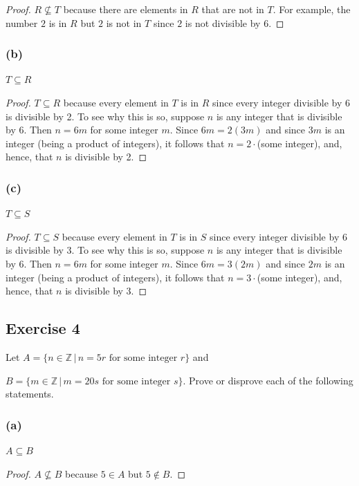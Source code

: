 \documentclass[14pt]{extarticle}
\newcommand{\Z}{\mathbb{Z}}
\begin{document}
\begin{proof}
\(R \nsubseteq T\) because there are elements in $R$ that are not in $T$. For example, the number $2$ is in $R$ but 
$2$ is not in $T$ since $2$ is not divisible by $6$.
\end{proof}

\subsubsection{(b)}
\(T \subseteq R\)

\begin{proof}
\(T \subseteq R\) because every element in $T$ is in $R$ since every integer divisible by 6 is divisible by 2. To 
see why this is so, suppose $n$ is any integer that is divisible by 6. Then $n = 6m$ for some integer $m$. Since 
\(6m = 2(3m)\) and since $3m$ is an integer (being a product of integers), it follows that \(n = 2 \cdot \)(some 
integer), and, hence, that $n$ is divisible by 2.
\end{proof}

\subsubsection{(c)}
\(T \subseteq S\)

\begin{proof}
\(T \subseteq S\) because every element in $T$ is in $S$ since every integer divisible by 6 is divisible by 3. To 
see why this is so, suppose $n$ is any integer that is divisible by 6. Then $n = 6m$ for some integer $m$. Since 
\(6m = 3(2m)\) and since $2m$ is an integer (being a product of integers), it follows that \(n = 3 \cdot \)(some 
integer), and, hence, that $n$ is divisible by 3.
\end{proof}

\subsection{Exercise 4}
Let \(A = \{n \in \Z \, | \, n = 5r \text{ for some integer } r\}\) and 

\(B = \{m \in \Z \, | \, m = 20s \text{ for some integer } s\}\). Prove or disprove each of the following statements.

\subsubsection{(a)}
\(A \subseteq B\)

\begin{proof}
\(A \nsubseteq B\) because $5 \in A$ but $5 \notin B$.
\end{proof}
\end{document}
